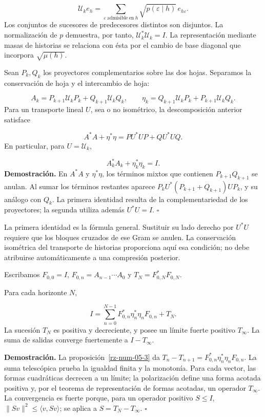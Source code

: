 \[
\mathcal U_ke_h=
\sum_{\varepsilon\ \mathrm{admisible\ en}\ h}
\sqrt{p(\varepsilon\mid h)}\,e_{h\varepsilon}.
\]
Los conjuntos de sucesores de predecesores distintos son disjuntos. La normalización de \(p\) demuestra, por tanto, \(\mathcal U_k^*\mathcal U_k=I\). La representación mediante masas de historias se relaciona con ésta por el cambio de base diagonal que incorpora \(\sqrt{\mu(h)}\).

Sean \(P_k,Q_k\) los proyectores complementarios sobre las dos hojas. Separamos la conservación de hoja y el intercambio de hoja:

\[
A_k=P_{k+1}\mathcal U_kP_k+Q_{k+1}\mathcal U_kQ_k,
\qquad
\eta_k=Q_{k+1}\mathcal U_kP_k+P_{k+1}\mathcal U_kQ_k.
\]
Para un transporte lineal \(U\), sea o no isométrico, la descomposición anterior satisface

\[
A^*A+\eta^*\eta=PU^*UP+QU^*UQ.
\]
En particular, para \(U=\mathcal U_k\),

\[
A_k^*A_k+\eta_k^*\eta_k=I.
\]
\textbf{Demostración.} En \(A^*A\) y \(\eta^*\eta\), los términos mixtos que contienen \(P_{k+1}Q_{k+1}\) se anulan. Al sumar los términos restantes aparece \(P_kU^*(P_{k+1}+Q_{k+1})UP_k\), y su análogo con \(Q_k\). La primera identidad resulta de la complementariedad de los proyectores; la segunda utiliza además \(U^*U=I\). \hfill\(\square\)

La primera identidad es la fórmula general. Sustituir su lado derecho por \(U^*U\) requiere que los bloques cruzados de ese Gram se anulen. La conservación isométrica del transporte de historias proporciona aquí esa condición; no debe atribuirse automáticamente a una compresión posterior.

Escribamos \(F_{0,0}=I\), \(F_{0,n}=A_{n-1}\cdots A_0\) y \(T_N=F_{0,N}^*F_{0,N}\).

Para cada horizonte \(N\),

\[
I=\sum_{n=0}^{N-1}
F_{0,n}^*\eta_n^*\eta_nF_{0,n}+T_N.
\]
La sucesión \(T_N\) es positiva y decreciente, y posee un límite fuerte positivo \(T_\infty\). La suma de salidas converge fuertemente a \(I-T_\infty\).

\textbf{Demostración.} La proposición~\ref{rz-num-05-3} da \(T_n-T_{n+1}=F_{0,n}^*\eta_n^*\eta_nF_{0,n}\). La suma telescópica prueba la igualdad finita y la monotonía. Para cada vector, las formas cuadráticas decrecen a un límite; la polarización define una forma acotada positiva y, por el teorema de representación de formas acotadas, un operador \(T_\infty\). La convergencia es fuerte porque, para un operador positivo \(S\leq I\), \(\|Sv\|^2\leq\langle v,Sv\rangle\); se aplica a \(S=T_N-T_\infty\). \hfill\(\square\)

